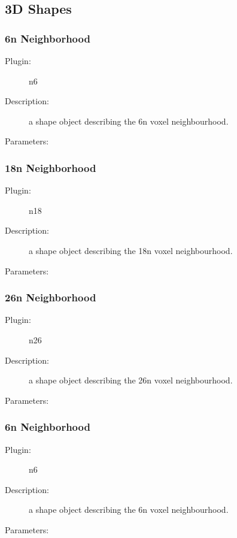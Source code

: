 \subsection{3D Shapes}
\label{sec:shapes3d}

\subsubsection*{6n Neighborhood }

\begin{description}
\item [Plugin:] n6
\item [Description:] a shape object describing the 6n voxel neighbourhood.
\item [Parameters:] 
\end{description}

\subsubsection*{18n Neighborhood }

\begin{description}
\item [Plugin:] n18
\item [Description:] a shape object describing the 18n voxel neighbourhood.
\item [Parameters:] 
\end{description}

\subsubsection*{26n Neighborhood }

\begin{description}
\item [Plugin:] n26
\item [Description:] a shape object describing the 26n voxel neighbourhood.
\item [Parameters:] 
\end{description}

\subsubsection*{6n Neighborhood }

\begin{description}
\item [Plugin:] n6
\item [Description:] a shape object describing the 6n voxel neighbourhood.
\item [Parameters:] 
\end{description}

